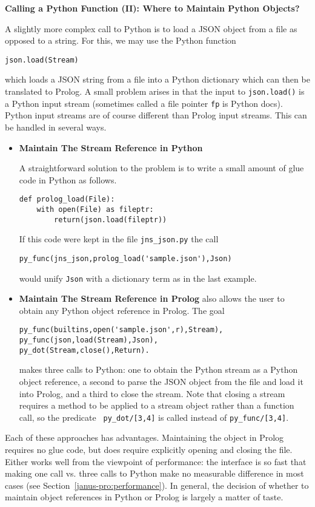 \begin{example} \rm {\bf Calling a Python Function (II): Where to Maintain Python Objects?} \label{jns-examp:glue}

\noindent
A slightly more complex call to Python is to load a JSON object from a
file as opposed to a string.  For this, we may use the Python function
{\tt

  {\tt json.load(Stream)}}

\noindent
which loads a JSON string from a file into a Python dictionary which
can then be translated to Prolog.  A small problem arises in that the
input to {\tt json.load()} is a Python input stream (sometimes called
a file pointer {\tt fp} is Python docs).  Python input streams are of
course different than Prolog input streams.  This can be handled in
several ways.

\begin{itemize}
  \item {\bf Maintain The Stream Reference in Python}

A straightforward solution to the problem is to write a small amount of
glue code in Python as follows.

\begin{verbatim}   
def prolog_load(File):
    with open(File) as fileptr:
        return(json.load(fileptr))
\end{verbatim}
\noindent
If this code were kept in the file {\tt jns\_json.py} the call
\begin{verbatim}
py_func(jns_json,prolog_load('sample.json'),Json)
\end{verbatim}
would unify {\tt Json} with a \janus{} dictionary term as in the last
example.

\item {\bf Maintain The Stream Reference in Prolog}
\janus{} also allows the user to obtain any Python object reference in
Prolog.  The goal
\begin{verbatim}   
py_func(builtins,open('sample.json',r),Stream),
py_func(json,load(Stream),Json),
py_dot(Stream,close(),Return).
\end{verbatim}
makes three calls to Python: one to obtain the Python stream as a
Python object reference, a second to parse the JSON object from the
file and load it into Prolog, and a third to close the stream.  Note
that closing a stream requires a method to be applied to a stream
object rather than a function call, so the \janus{} predicate {\tt
  py\_dot/[3,4]} is called instead of {\tt py\_func/[3,4]}.
\end{itemize}

Each of these approaches has advantages.  Maintaining the object in
Prolog requires no glue code, but does require explicitly opening and
closing the file.  Either works well from the viewpoint of
performance: the \janus{} interface is so fast that making one call
vs. three calls to Python make no measurable difference in most cases
(see Section~\ref{janus-pro:performance}).  In general, the decision of
whether to maintain object references in Python or Prolog is largely a
matter of taste.
\end{example}

